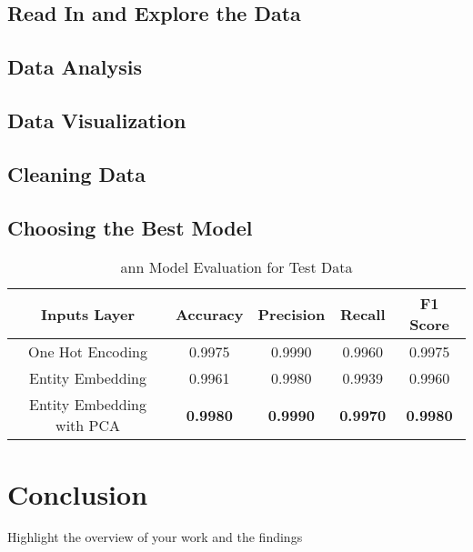 \documentclass[conference]{IEEEtran}
\begin{document}
\subsection{Read In and Explore the Data}
\subsection{Data Analysis}
\subsection{Data Visualization}
\subsection{Cleaning Data}
\subsection{Choosing the Best Model}
\begin{table}[h!]
  \centering 
  \caption{\acrshort{ann} Model Evaluation for Test Data}
  \vspace*{5mm}
  \label{table:tab2}
  \begin{tabular}{ccccc}\hline
    \textbf{Inputs Layer} & \textbf{Accuracy} & \textbf{Precision} & \textbf{Recall} & \textbf{F1 Score}\\ \hline
    One Hot Encoding & 0.9975 & 0.9990 & 0.9960 & 0.9975\\
    Entity Embedding & 0.9961 & 0.9980 & 0.9939 & 0.9960\\
    Entity Embedding with PCA & \textbf{0.9980} & \textbf{0.9990}& \textbf{0.9970} & \textbf{0.9980}\\ \hline
  \end{tabular}
\end{table}
\section{Conclusion}
Highlight the overview of your work and the findings
\end{document}
